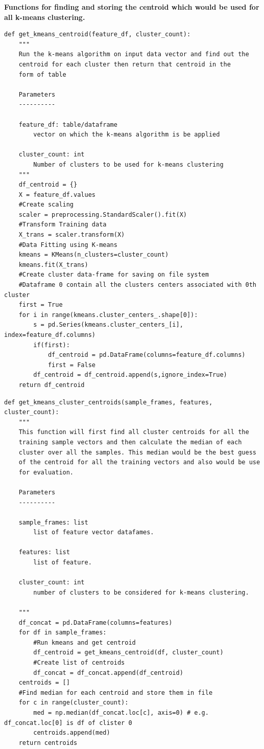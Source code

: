 \documentclass{article}
\begin{document}
\pagebreak
\textbf{\large{Functions for finding and storing the centroid which would be used for all k-means clustering.}}
\begin{verbatim}
def get_kmeans_centroid(feature_df, cluster_count):
    """
    Run the k-means algorithm on input data vector and find out the
    centroid for each cluster then return that centroid in the
    form of table

    Parameters
    ----------

    feature_df: table/dataframe
        vector on which the k-means algorithm is be applied

    cluster_count: int
        Number of clusters to be used for k-means clustering
    """
    df_centroid = {}
    X = feature_df.values
    #Create scaling
    scaler = preprocessing.StandardScaler().fit(X)
    #Transform Training data
    X_trans = scaler.transform(X)
    #Data Fitting using K-means
    kmeans = KMeans(n_clusters=cluster_count)
    kmeans.fit(X_trans)
    #Create cluster data-frame for saving on file system
    #Dataframe 0 contain all the clusters centers associated with 0th cluster
    first = True
    for i in range(kmeans.cluster_centers_.shape[0]):
        s = pd.Series(kmeans.cluster_centers_[i], index=feature_df.columns)
        if(first):
            df_centroid = pd.DataFrame(columns=feature_df.columns)
            first = False
        df_centroid = df_centroid.append(s,ignore_index=True)
    return df_centroid
\end{verbatim}
\begin{verbatim}
def get_kmeans_cluster_centroids(sample_frames, features, cluster_count):
    """
    This function will first find all cluster centroids for all the
    training sample vectors and then calculate the median of each
    cluster over all the samples. This median would be the best guess
    of the centroid for all the training vectors and also would be use
    for evaluation.

    Parameters
    ----------

    sample_frames: list
        list of feature vector datafames.

    features: list
        list of feature.

    cluster_count: int
        number of clusters to be considered for k-means clustering.

    """
    df_concat = pd.DataFrame(columns=features)
    for df in sample_frames:
        #Run kmeans and get centroid
        df_centroid = get_kmeans_centroid(df, cluster_count)
        #Create list of centroids
        df_concat = df_concat.append(df_centroid)
    centroids = []
    #Find median for each centroid and store them in file
    for c in range(cluster_count):
        med = np.median(df_concat.loc[c], axis=0) # e.g. df_concat.loc[0] is df of clister 0
        centroids.append(med)
    return centroids
\end{verbatim}
\end{document}
